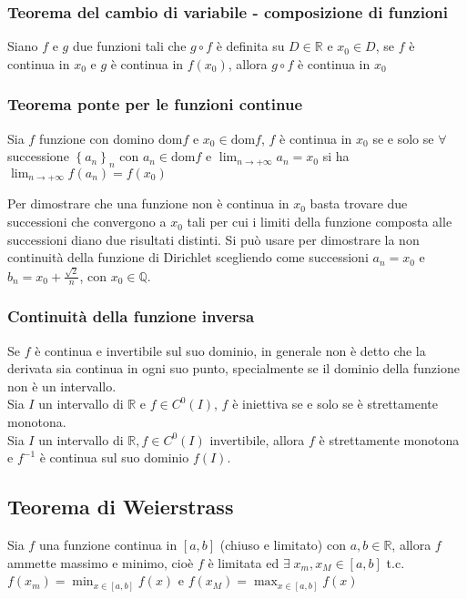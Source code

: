 \documentclass[a4paper]{article}
\newcommand\dom{\text{dom}}
\newcommand\cont[2]{C^{#1} ({#2})}
\begin{document}
\subsubsection*{Teorema del cambio di variabile - composizione di funzioni}
Siano \(f\) e \(g\) due funzioni tali che \(g \circ f\) è definita su \(D \in \mathbb{R}\) e \(x_0 \in D\),
se \(f\) è continua in \(x_0\) e \(g\) è continua in \(f(x_0)\), allora \(g \circ f\) è continua in \(x_0\)

\subsubsection*{Teorema ponte per le funzioni continue}
Sia \(f\) funzione con domino \(\dom f\) e \(x_0 \in \dom f\), \(f\) è continua in \(x_0\) se e solo se \(\forall\) successione \(\left\{a_n\right\}_n\)
con \(a_n \in \dom f\) e \(\displaystyle \lim_{n \to +\infty} a_n = x_0\) si ha \(\displaystyle \lim_{n \to +\infty} f(a_n) = f(x_0)\)

Per dimostrare che una funzione non è continua in \(x_0\) basta trovare due successioni che convergono a \(x_0\) tali per cui
i limiti della funzione composta alle successioni diano due risultati distinti. Si può usare per dimostrare la non continuità
della funzione di Dirichlet scegliendo come successioni \(a_n = x_0\) e \(b_n = x_0 + \frac{\sqrt{2}}{n}\), con \(x_0 \in \mathbb{Q}\).

\subsubsection*{Continuità della funzione inversa}
Se \(f\) è continua e invertibile sul suo dominio, in generale non è detto che la derivata sia continua in ogni suo punto,
specialmente se il dominio della funzione non è un intervallo. \\
Sia \(I\) un intervallo di \(\mathbb{R}\) e \(f \in \cont{0}{I}\), \(f\) è iniettiva se e solo se è strettamente monotona. \\
Sia \(I\) un intervallo di \(\mathbb{R}, f \in \cont{0}{I}\) invertibile, allora \(f\) è strettamente monotona e \(f^{-1}\)
è continua sul suo dominio \(f(I)\).

\subsection{Teorema di Weierstrass}
Sia \(f\) una funzione continua in \(\left[a, b\right]\) (chiuso e limitato) con \(a,b \in \mathbb{R}\), allora \(f\) ammette massimo e minimo,
cioè \(f\) è limitata ed \(\exists \; x_m, x_M \in \left[a, b\right]\) t.c. \(\displaystyle f(x_m) = \min_{x \in \left[a, b\right]} f(x)\)
e \(\displaystyle f(x_M) = \max_{x \in \left[a, b\right]} f(x)\)
\end{document}
